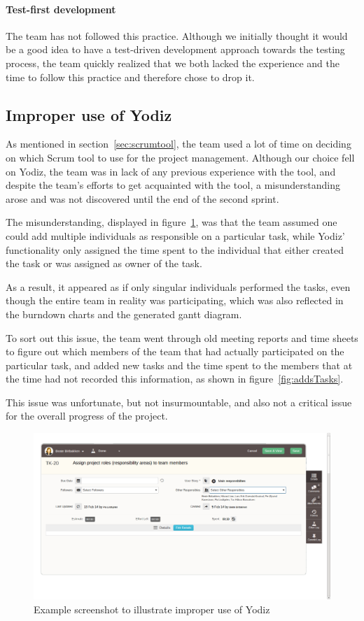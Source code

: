 \paragraph{Test-first development}
The team has not followed this practice. Although we initially thought it would be a good idea to have a test-driven development approach towards the testing process, the team quickly realized that we both lacked the experience and the time to follow this practice and therefore chose to drop it.




\subsection{Improper use of Yodiz}
\label{sec:improperScrum}
As mentioned in section~\ref{sec:scrumtool}, the team used a lot of time on
deciding on which Scrum tool to use for the project management. Although our
choice fell on Yodiz, the team was in lack of any previous experience with the
tool, and despite the team's efforts to get acquainted with the tool, a
misunderstanding arose and was not discovered until the end of the second
sprint.

The misunderstanding, displayed in figure~\ref{fig:wrongUse}, was that the team
assumed one could add multiple individuals as responsible on a particular task,
while Yodiz' functionality only assigned the time spent to the individual that
either created the task or was assigned as owner of the task.

As a result, it appeared as if only singular individuals performed the tasks,
even though the entire team in reality was participating, which was also
reflected in the burndown charts and the generated gantt diagram. 

To sort out this issue, the team went through old meeting reports and time sheets
to figure out which members of the team that had actually participated on the
particular task, and added new tasks and the time spent to the members that at
the time had not recorded this information, as shown in
figure~\ref{fig:addsTasks}.

This issue was unfortunate, but not insurmountable, and also not a critical
issue for the overall progress of the project.

\begin{figure}[H]
\includegraphics[width=\textwidth]{ch/devProcess/fig/wrongUse.png}
\caption{Example screenshot to illustrate improper use of Yodiz}
\label{fig:wrongUse}
\end{figure}

